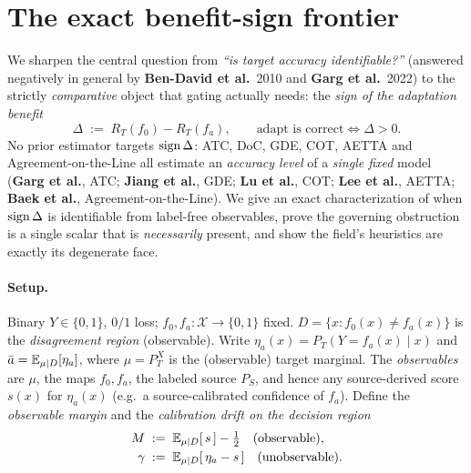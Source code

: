 \section{The exact benefit-sign frontier}\label{sec:bsfrontier}

We sharpen the central question from \emph{``is target accuracy identifiable?''}
(answered negatively in general by \textbf{Ben-David et al.}\ 2010 and \textbf{Garg et al.}\ 2022) to the
strictly \emph{comparative} object that gating actually needs: the \emph{sign of the
adaptation benefit}
\[
  \Delta \;:=\; R_T(f_0)-R_T(f_a),\qquad \text{adapt is correct}\iff \Delta>0 .
\]
No prior estimator targets $\operatorname{sign}\Delta$: ATC, DoC, GDE, COT, AETTA and
Agreement-on-the-Line all estimate an \emph{accuracy level} of a \emph{single fixed}
model (\textbf{Garg et al.}, ATC; \textbf{Jiang et al.}, GDE; \textbf{Lu et al.}, COT;
\textbf{Lee et al.}, AETTA; \textbf{Baek et al.}, Agreement-on-the-Line).
We give an exact characterization of when $\operatorname{sign}\Delta$ is identifiable from label-free
observables, prove the governing obstruction is a single scalar that is \emph{necessarily}
present, and show the field's heuristics are exactly its degenerate face.

\paragraph{Setup.} Binary $Y\in\{0,1\}$, $0/1$ loss; $f_0,f_a:\mathcal X\to\{0,1\}$ fixed.
$D=\{x:f_0(x)\neq f_a(x)\}$ is the \emph{disagreement region} (observable). Write
$\eta_a(x)=P_T(Y=f_a(x)\mid x)$ and $\bar a=\mathbb{E}_{\mu\mid D}[\eta_a]$, where $\mu=P_T^X$ is
the (observable) target marginal. The \emph{observables} are $\mu$, the maps $f_0,f_a$, the
labeled source $P_S$, and hence any source-derived score $s(x)$ for $\eta_a(x)$ (e.g.\ a
source-calibrated confidence of $f_a$). Define the \emph{observable margin} and the
\emph{calibration drift on the decision region}
\[
  \begin{aligned}
  M &\;:=\; \mathbb{E}_{\mu\mid D}[\,s\,]-\tfrac12 \quad(\text{observable}),\\
  \gamma &\;:=\; \mathbb{E}_{\mu\mid D}[\,\eta_a-s\,]\quad(\text{unobservable}).
  \end{aligned}
\]

